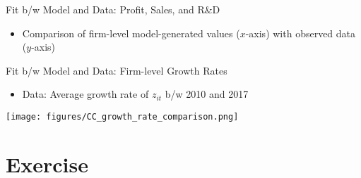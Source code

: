 \documentclass[
  10pt,               %
  aspectratio=169,     %
]{beamer}
\theoremstyle{plain}
\begin{document}
\begin{frame}{Fit b/w Model and Data: Profit, Sales, and R\&D}
  \begin{itemize}
    \item Comparison of firm-level model-generated values ($x$-axis) with observed data ($y$-axis)
  \end{itemize}
  \medskip{}
  \begin{center}
    \begin{figure}
      \centering{}\setcounter{subfigure}{0}
    \end{figure}
    \par\end{center}
\end{frame}

\begin{frame}{Fit b/w Model and Data: Firm-level Growth Rates}
  \begin{itemize}
    \item Data: Average growth rate of $z_{it}$ b/w 2010 and 2017
  \end{itemize}
  \medskip{}
  \begin{center}
    \texttt{[image: figures/CC\_growth\_rate\_comparison.png]}
  \end{center}
\end{frame}

\section{Exercise}
\end{document}
